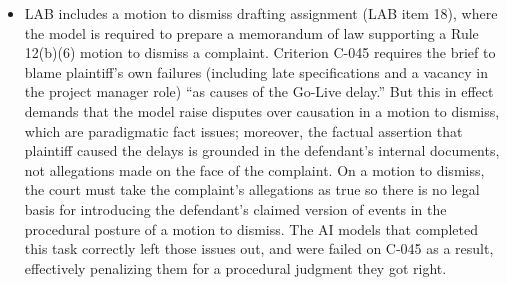 \documentclass[11pt]{article}
\begin{document}
\begin{itemize}
\item LAB includes a motion to dismiss drafting assignment (LAB item 18), where the model is required to prepare a memorandum of law supporting a Rule 12(b)(6) motion to dismiss a complaint. Criterion C-045 requires the brief to blame plaintiff's own failures (including late specifications and a vacancy in the project manager role) ``as causes of the Go-Live delay.'' But this in effect demands that the model raise disputes over causation in a motion to dismiss, which are paradigmatic fact issues; moreover, the factual assertion that plaintiff caused the delays is grounded in the defendant's internal documents, not allegations made on the face of the complaint. On a motion to dismiss, the court must take the complaint's allegations as true so there is no legal basis for introducing the defendant's claimed version of events in the procedural posture of a motion to dismiss. The AI models that completed this task correctly left those issues out, and were failed on C-045 as a result, effectively penalizing them for a procedural judgment they got right.
\end{itemize}
\end{document}
